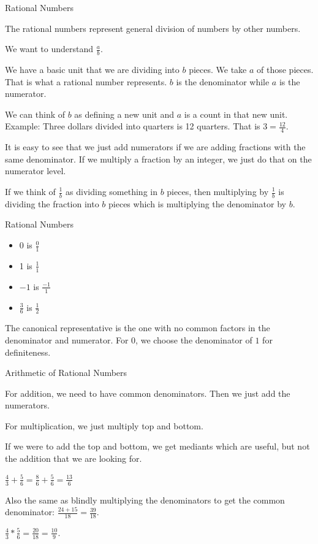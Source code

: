 \documentclass{beamer}
\begin{document}
\begin{frame}{Rational Numbers}

The rational numbers represent general division of numbers by other numbers. 

We want to understand $\frac{a}{b}$.

We have a basic unit that we are dividing into $b$ pieces. We take $a$ of those pieces.  That is what a rational number represents. $b$ is the denominator while $a$ is the numerator.

We can think of $b$ as defining a new unit and $a$ is a count in that new unit. Example:  Three dollars divided into quarters is 12 quarters. That is $3 = \frac{12}{4}$.

It is easy to see that we just add numerators if we are adding fractions with the same denominator. If we multiply a fraction by an integer, we just do that on the numerator level. 

If we think of $\frac{1}{b}$ as dividing something in $b$ pieces, then multiplying by $\frac{1}{b}$ is dividing the fraction into $b$ pieces which is multiplying the denominator by $b$. 

\end{frame}

\begin{frame}{Rational Numbers}

\begin{itemize}
    \item 0 is  $\frac{0}{1}$
    \item 1 is  $\frac{1}{1}$
    \item $-1$ is $\frac{-1}{1}$
    \item $\frac{3}{6}$ is $\frac{1}{2}$
\end{itemize}

The canonical representative is the one with no common factors in the denominator and numerator. For $0$, we choose the denominator of $1$ for definiteness. 


\end{frame}

\begin{frame}{Arithmetic of  Rational Numbers}

For addition, we need to have common denominators. Then we just add the numerators. 

For multiplication, we just multiply top and bottom. 

If we were to add the top and bottom, we get mediants which are useful, but not the addition that we are looking for. 

$\frac{4}{3} + \frac{5}{6} = \frac{8}{6} + \frac{5}{6} = \frac{13}{6}$ 

Also the same as blindly multiplying the denominators to get the common denominator:  $\frac{24 + 15}{18} = \frac{39}{18}$.

$\frac{4}{3} * \frac{5}{6} = \frac{20}{18} = \frac{10}{9}$.

\end{frame}
\end{document}
